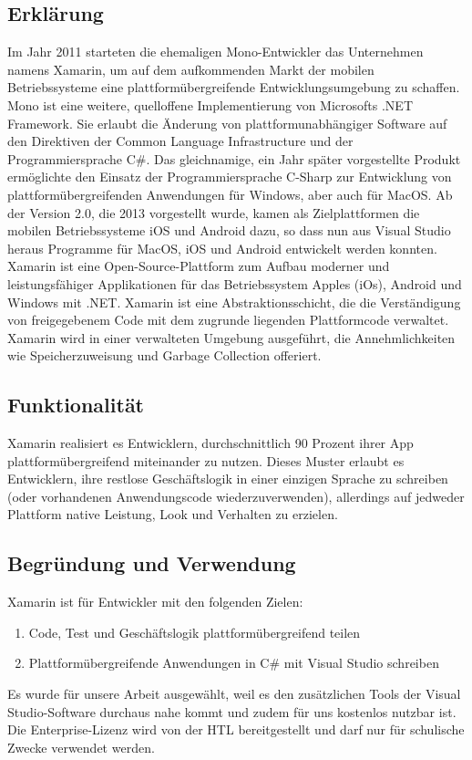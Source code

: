 \subsection*{Erklärung}
Im Jahr 2011 starteten die ehemaligen Mono-Entwickler das Unternehmen 
namens Xamarin, um auf dem aufkommenden Markt der mobilen Betriebssysteme 
eine plattformübergreifende Entwicklungsumgebung zu schaffen. 
Mono ist eine weitere, quelloffene Implementierung von Microsofts .NET Framework. 
Sie erlaubt die Änderung von plattformunabhängiger Software auf den Direktiven 
der Common Language Infrastructure und der Programmiersprache C\#.
Das gleichnamige, ein Jahr später vorgestellte Produkt ermöglichte den 
Einsatz der Programmiersprache C-Sharp zur Entwicklung von 
plattformübergreifenden Anwendungen für Windows, aber auch für MacOS. 
Ab der Version 2.0, die 2013 vorgestellt wurde, kamen als Zielplattformen 
die mobilen Betriebssysteme iOS und Android dazu, so dass nun aus Visual 
Studio heraus Programme für MacOS, iOS und Android entwickelt werden 
konnten. 
Xamarin ist eine Open-Source-Plattform zum Aufbau moderner 
und leistungsfähiger Applikationen für das Betriebssystem Apples (iOs), 
Android und Windows mit .NET. Xamarin ist eine Abstraktionsschicht, 
die die Verständigung von freigegebenem Code mit dem zugrunde liegenden 
Plattformcode verwaltet. Xamarin wird in einer verwalteten Umgebung 
ausgeführt, die Annehmlichkeiten wie Speicherzuweisung und Garbage 
Collection offeriert.
\subsection*{Funktionalität}
Xamarin realisiert es Entwicklern, durchschnittlich 90 Prozent ihrer App 
plattformübergreifend miteinander zu nutzen. Dieses Muster erlaubt es 
Entwicklern, ihre restlose Geschäftslogik in einer einzigen Sprache 
zu schreiben (oder vorhandenen Anwendungscode wiederzuverwenden), 
allerdings auf jedweder Plattform native Leistung, Look und Verhalten 
zu erzielen.
\subsection*{Begründung und Verwendung}
Xamarin ist für Entwickler mit den folgenden Zielen:
\begin{enumerate}
    \item Code, Test und Geschäftslogik plattformübergreifend teilen
    \item Plattformübergreifende Anwendungen in C\# mit Visual Studio schreiben
\end{enumerate}
Es wurde für unsere Arbeit ausgewählt, weil es den zusätzlichen Tools 
der Visual Studio-Software durchaus nahe kommt und zudem für uns kostenlos 
nutzbar ist. Die Enterprise-Lizenz wird von der HTL bereitgestellt und 
darf nur für schulische Zwecke verwendet werden.